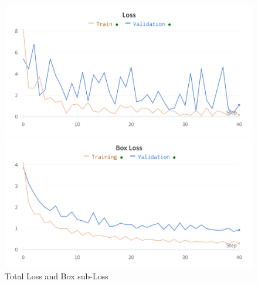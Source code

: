 \documentclass{article}
\begin{document}
\begin{figure}
    \begin{minipage}{0.48\textwidth}
        \includegraphics[width=\textwidth]{loss.png}
    \end{minipage}
    \begin{minipage}{0.48\textwidth}
        \includegraphics[width=\textwidth]{box_loss.png}
    \end{minipage}
    \caption{Total Loss and Box sub-Loss} %
    \label{fig:results_loss}
\end{figure}
\end{document}
